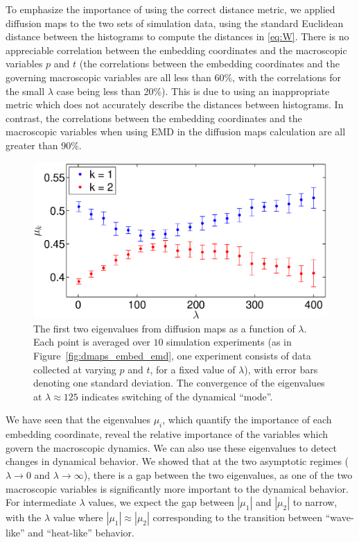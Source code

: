 \documentclass[preprint]{elsarticle}
\begin{document}

To emphasize the importance of using the correct distance metric, we applied diffusion maps to the two sets of simulation data, using the standard Euclidean distance between the histograms to compute the distances in \eqref{eq:W}.
%
There is no appreciable correlation between the embedding coordinates and the macroscopic variables $p$ and $t$ (the correlations between the embedding coordinates and the governing macroscopic variables are all  less than 60\%, with the correlations for the small $\lambda$ case being less than 20\%). 
%
This is due to using an inappropriate metric which does not accurately describe the distances between histograms.
%
In contrast, the correlations between the embedding coordinates and the macroscopic variables when using EMD in the diffusion maps calculation are all greater than 90\%.



\begin{figure}[t] 
\centering
\includegraphics[width=\textwidth]{detect_change_eigenvalues}
\caption{The first two eigenvalues from diffusion maps as a function of $\lambda$. Each point is averaged over $10$ simulation experiments (as in Figure~\ref{fig:dmaps_embed_emd}, one experiment consists of data collected at varying $p$ and $t$, for a fixed value of $\lambda$), with error bars denoting one standard deviation. 
The convergence of the eigenvalues at $\lambda \approx 125$ indicates switching of the dynamical ``mode''.}
\label{fig:detect_change}
\end{figure}

We have seen that the eigenvalues $\mu_i$, which quantify the importance of each embedding coordinate, reveal the relative importance of the variables which govern the macroscopic dynamics.
%
We can also use these eigenvalues to detect changes in dynamical behavior.
%
We showed that at the two asymptotic regimes ($\lambda \rightarrow 0$ and $\lambda \rightarrow \infty$), there is a gap between the two eigenvalues, as one of the two macroscopic variables is significantly more important to the dynamical behavior.
%
For intermediate $\lambda$ values, we expect the gap between $|\mu_1|$ and $|\mu_2|$ to narrow, with the $\lambda$ value where $|\mu_1| \approx |\mu_2|$ corresponding to the transition between ``wave-like'' and ``heat-like'' behavior. 
\end{document}
